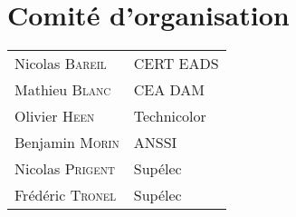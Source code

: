 
\section*{Comit\'e d'organisation}
\begin{tabular}{@{}p{5cm}@{}p{6.5cm}@{}}
  Nicolas  \textsc{Bareil}        & CERT EADS                             \\
  Mathieu  \textsc{Blanc}         & CEA DAM                               \\
  Olivier  \textsc{Heen}          & Technicolor                           \\
  Benjamin  \textsc{Morin}        & ANSSI                                 \\
  Nicolas  \textsc{Prigent}       & Sup\'elec                             \\
  Fr\'ed\'eric  \textsc{Tronel}   & Sup\'elec                             \\
\end{tabular}

